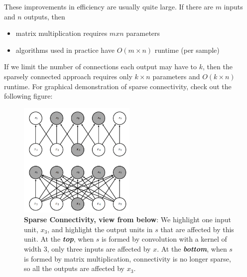 \documentclass{report}
\begin{document}
\noindent These improvements in efficiency are usually quite large. If there are $m$ inputs and
$n$ outputs, then 
\begin{itemize}
	\item matrix multiplication requires $mxn$ parameters
    \item algorithms used in practice have $O(m \times n)$ runtime (per sample)
\end{itemize}
If we limit the number of connections each output may have to $k$, then the sparsely connected approach requires only $k \times n$ parameters and $O(k \times n)$ runtime. For graphical demonstration of sparse connectivity, check out the following figure:

\begin{figure}[H]
  \centering
  \includegraphics[width=0.5\textwidth]{Convolutional_Networks/sparse_connectivity_1.png}
  \caption{\textbf{Sparse Connectivity, view from below}: We highlight one input unit, $x_3$, and highlight the output units in $s$ that are affected by this unit. At the \textbf{\textit{top}}, when $s$ is formed by convolution with a kernel of width 3, only three inputs are affected by $x$. At the \textbf{\textit{bottom}}, when $s$ is formed by matrix multiplication, connectivity is no longer sparse, so all the outputs are affected by $x_3$.}
\end{figure}
\end{document}
